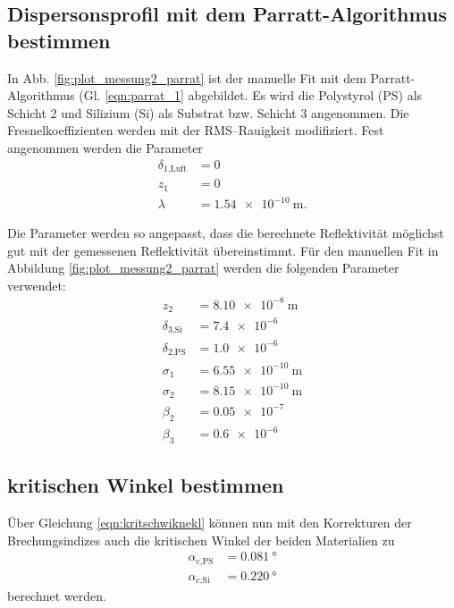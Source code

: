 \subsection{Dispersonsprofil mit dem Parratt-Algorithmus bestimmen} %

In Abb. \ref{fig:plot_messung2_parrat} ist der manuelle Fit mit dem
Parratt-Algorithmus (Gl. \eqref{eqn:parrat_1} abgebildet.
Es wird die Polystyrol (PS) als Schicht 2 und Silizium
(Si) als Substrat bzw. Schicht 3 angenommen.
Die Fresnelkoeffizienten werden mit der RMS–Rauigkeit modifiziert.
Fest angenommen werden die Parameter
 \begin{align*}
  \delta_\text{1,Luft} &= 0 \\
  z_1 &= 0 \\
  \lambda &= \SI{1.54e-10}{\meter}.
\end{align*}

Die Parameter werden so angepasst, dass die berechnete Reflektivität möglichst 
gut mit der gemessenen Reflektivität übereinstimmt.
Für den manuellen Fit in Abbildung \ref{fig:plot_messung2_parrat} werden die folgenden 
Parameter verwendet:
\begin{align*}
  z_2 &= \SI{8.10e-8}{\meter}\\
  \delta_\text{3,Si} &= \num{7.4e-6}\\
  \delta_\text{2,PS} &= \num{1.0e-6}\\
  \sigma_1 &= \SI{6.55e-10}{\meter} \\
  \sigma_2 &= \SI{8.15e-10}{\meter} \\
  \beta_2 &= \num{0.05e-7}\\
  \beta_3 &= \num{0.6e-6}
\end{align*}


\subsection{kritischen Winkel bestimmen}
Über Gleichung \eqref{eqn:kritschwiknekl} können nun mit den Korrekturen der Brechungsindizes auch die kritischen Winkel der beiden Materialien zu 
\begin{align*}
    \alpha_\text{c,PS} &= \SI{0.081}{\degree} \\
    \alpha_\text{c,Si} &= \SI{0.220}{\degree}
\end{align*}
berechnet werden.




